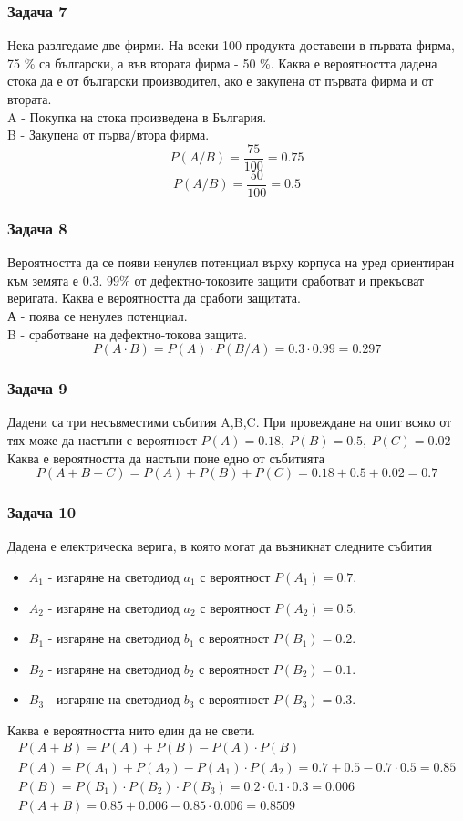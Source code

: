 \documentclass[fleqn, 12pt]{article}
\theoremstyle{definition}
\begin{document}
\subsubsection*{Задача 7}
Нека разлгедаме две фирми. На всеки 100 продукта доставени в първата фирма, 75 \% са български, а във втората фирма - 50 \%. Каква е вероятността дадена стока да е от български производител, ако е закупена от първата фирма и от втората. \\
A - Покупка на стока произведена в България. \\
B - Закупена от първа/втора фирма.
$$P(A/B) = \frac{75}{100} = 0.75$$
$$P(A/B) = \frac{50}{100} = 0.5$$

\subsubsection*{Задача 8}
Вероятността да се появи ненулев потенциал върху корпуса на уред ориентиран към земята е 0.3. 99\% от дефектно-токовите защити сработват и прекъсват веригата. Каква е вероятността да сработи защитата. \\
А - поява се ненулев потенциал. \\
B - сработване на дефектно-токова защита.
$$P(A \cdot B) = P(A)\cdot P(B/A) = 0.3 \cdot 0.99 = 0.297$$

\subsubsection*{Задача 9}
Дадени са три несъвместими събития A,B,C. При провеждане на опит всяко от тях може да настъпи с вероятност $P(A) = 0.18,\ P(B) = 0.5,\ P(C) = 0.02$ Каква е вероятността да настъпи поне едно от събитията
$$P(A+B+C) = P(A) + P(B) + P(C) = 0.18 + 0.5 + 0.02 = 0.7$$

\subsubsection*{Задача 10}
Дадена е електрическа верига, в която могат да възникнат следните събития
\begin{itemize}
\item $A_1$ - изгаряне на светодиод $a_1$ с вероятност $P(A_1) = 0.7$.
\item $A_2$ - изгаряне на светодиод $a_2$ с вероятност $P(A_2) = 0.5$.
\item $B_1$ - изгаряне на светодиод $b_1$ с вероятност $P(B_1) = 0.2$.
\item $B_2$ - изгаряне на светодиод $b_2$ с вероятност $P(B_2) = 0.1$.
\item $B_3$ - изгаряне на светодиод $b_3$ с вероятност $P(B_3) = 0.3$.
\end{itemize}
Каква е вероятността нито един да не свети.
\begin{gather*}
P(A+B) = P(A) + P(B) - P(A) \cdot P(B)\\
P(A) = P(A_1) +P(A_2) - P(A_1)\cdot P(A_2) = 0.7+0.5-0.7 \cdot 0.5 = 0.85 \\
P(B) = P(B_1) \cdot P(B_2) \cdot P(B_3) = 0.2 \cdot 0.1 \cdot 0.3 = 0.006 \\
P(A+B) = 0.85 + 0.006 - 0.85 \cdot 0.006 = 0.8509 
\end{gather*}
\end{document}
